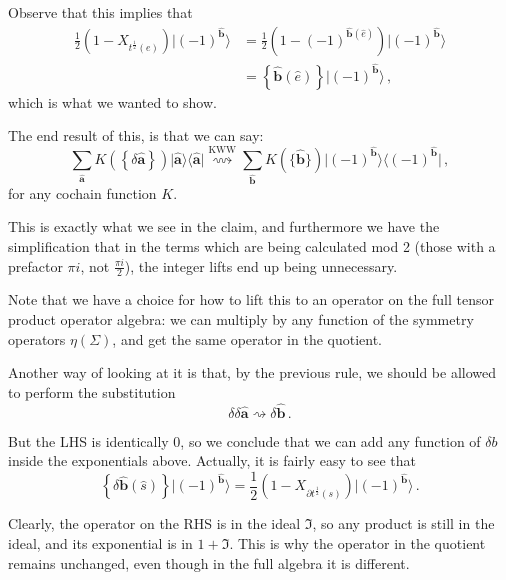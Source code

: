 \documentclass[aps,twocolumn,prx,floatfix,preprintnumbers, nofootinbib,10pt]{revtex4-2}
\numberwithin{equation}{section}
\theoremstyle{definition}
\theoremstyle{remark}
\theoremstyle{claim}
\newcommand{\be}{\begin{equation}}
\newcommand{\ee}{\end{equation}}
\newcommand{\lbbb}{\left\{}
\newcommand{\rbbb}{\right\}}
\newcommand{\lrb}[1]{\lbbb #1 \rbbb}
\def\bra#1{{\langle{#1}|}}
\def\ket#1{{|{#1}\rangle}}
\newcommand{\paren}[1]{\left( #1 \right)}
\begin{document}
Observe that this implies that
\begin{align}
\frac{1}{2} \paren{1 - X_{t^\frac{1}{2}(e)}} \ket{(-1)^{\bm{\hat{b}}}}
&= \frac{1}{2} \paren{1 - (-1)^{\bm{\hat{b}}(\hat{e})}} \ket{(-1)^{\bm{\hat{b}}}} \nonumber \\
&= \lrb{\bm{\hat{b}}(\hat{e})} \ket{(-1)^{\bm{\hat{b}}}} \,,
\end{align}
which is what we wanted to show.

The end result of this, is that we can say:
\be
\sum_{\bm{\hat{a}}} K(\lrb{\delta \bm{\hat{a}}}) \ket{\bm{\hat{a}}} \bra{\bm{\hat{a}}} \overset{\text{KWW}}{\rightsquigarrow}
\sum_{\bm{\hat{b}}} K(\{\bm{\hat{b}}\}) \ket{(-1)^{\bm{\hat{b}}}} \bra{(-1)^{\bm{\hat{b}}}} \,,
\ee
for any cochain function $K$.

This is exactly what we see in the claim, and furthermore we have the simplification that in the terms which are being calculated mod 2 (those with a prefactor $\pi i$, not $\frac{\pi i}{2}$), the integer lifts end up being unnecessary.



Note that we have a choice for how to lift this to an operator on the full tensor product operator algebra: we can multiply by any function of the symmetry operators $\eta(\Sigma)$, and get the same operator in the quotient.

Another way of looking at it is that, by the previous rule, we should be allowed to perform the substitution
\be
\delta \delta \bm{\hat{a}} \rightsquigarrow \delta \bm{\hat{b}} \,.
\ee

But the LHS is identically 0, so we conclude that we can add any function of $\delta b$ inside the exponentials above. Actually, it is fairly easy to see that
\be
\lrb{\delta \bm{\hat{b}}(\hat{s})} \ket{(-1)^{\bm{\hat{b}}}} = \frac{1}{2} \paren{1 - X_{\partial t^{\frac{1}{2}}(s)}} \ket{(-1)^{\bm{\hat{b}}}} \,.
\ee

Clearly, the operator on the RHS is in the ideal $\mathfrak{I}$, so any product is still in the ideal, and its exponential is in $1 + \mathfrak{I}$. This is why the operator in the quotient remains unchanged, even though in the full algebra it is different.
\end{document}

